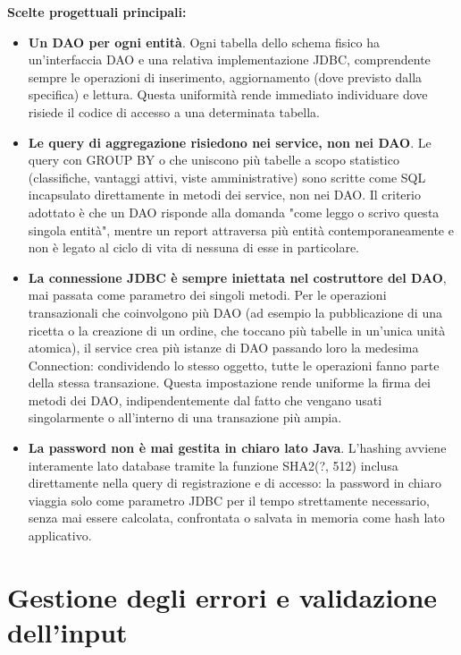 \textbf{Scelte progettuali principali:}
\begin{itemize}
    \item \textbf{Un DAO per ogni entità}. Ogni tabella dello schema fisico ha un'interfaccia DAO e una relativa implementazione JDBC, comprendente sempre le operazioni di inserimento, aggiornamento (dove previsto dalla specifica) e lettura. Questa uniformità rende immediato individuare dove risiede il codice di accesso a una determinata tabella.
    \item \textbf{Le query di aggregazione risiedono nei service, non nei DAO}. Le query con GROUP BY o che uniscono più tabelle a scopo statistico (classifiche, vantaggi attivi, viste amministrative) sono scritte come SQL incapsulato direttamente in metodi dei service, non nei DAO. Il criterio adottato è che un DAO risponde alla domanda "come leggo o scrivo questa singola entità", mentre un report attraversa più entità contemporaneamente e non è legato al ciclo di vita di nessuna di esse in particolare.
    \item \textbf{La connessione JDBC è sempre iniettata nel costruttore del DAO}, mai passata come parametro dei singoli metodi. Per le operazioni transazionali che coinvolgono più DAO (ad esempio la pubblicazione di una ricetta o la creazione di un ordine, che toccano più tabelle in un'unica unità atomica), il service crea più istanze di DAO passando loro la medesima Connection: condividendo lo stesso oggetto, tutte le operazioni fanno parte della stessa transazione. Questa impostazione rende uniforme la firma dei metodi dei DAO, indipendentemente dal fatto che vengano usati singolarmente o all'interno di una transazione più ampia.
    \item \textbf{La password non è mai gestita in chiaro lato Java}. L'hashing avviene interamente lato database tramite la funzione SHA2(?, 512) inclusa direttamente nella query di registrazione e di accesso: la password in chiaro viaggia solo come parametro JDBC per il tempo strettamente necessario, senza mai essere calcolata, confrontata o salvata in memoria come hash lato applicativo.
\end{itemize}

\vspace{1em}

\section{Gestione degli errori e validazione dell'input}

